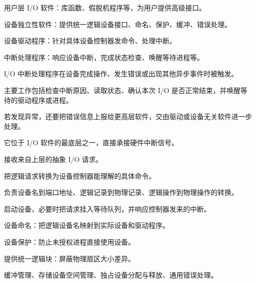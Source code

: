 \begin{points}
  \item 用户层 I/O 软件：库函数、假脱机程序等，为用户提供高级接口。
  \item 设备独立性软件：提供统一逻辑设备接口、命名、保护、缓冲、错误处理。
  \item 设备驱动程序：针对具体设备控制器发命令、处理中断。
  \item 中断处理程序：响应设备中断，完成状态检查、唤醒等待进程等。
\end{points}


\begin{points}
  \item I/O 中断处理程序在设备完成操作、发生错误或出现其他异步事件时被触发。
  \item 主要工作包括检查中断原因、读取状态、确认本次 I/O 是否正常结束，并唤醒等待的驱动程序或进程。
  \item 若发现异常，还要把错误信息上报给更高层软件，交由驱动或设备无关软件进一步处理。
  \item 它位于 I/O 软件的最底层之一，直接承接硬件中断信号。
\end{points}


\begin{points}
  \item 接收来自上层的抽象 I/O 请求。
  \item 把逻辑请求转换为设备控制器能理解的具体命令。
  \item 负责设备名到端口地址、逻辑记录到物理记录、逻辑操作到物理操作的转换。
  \item 启动设备，必要时把请求挂入等待队列，并响应控制器发来的中断。
\end{points}


\begin{points}
  \item 设备命名：把逻辑设备名映射到实际设备和驱动程序。
  \item 设备保护：防止未授权进程直接使用设备。
  \item 提供统一逻辑块：屏蔽物理扇区大小差异。
  \item 缓冲管理、存储设备空间管理、独占设备分配与释放、通用错误处理。
\end{points}


